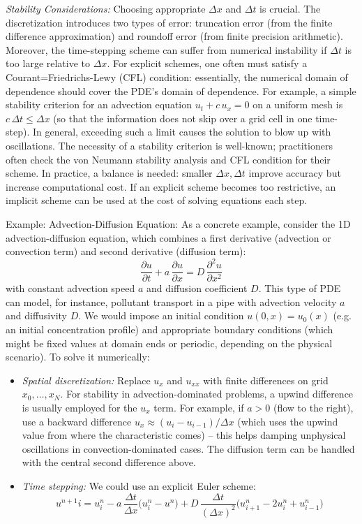 \documentclass{adonis}
\begin{document}
\textit{Stability Considerations:} Choosing appropriate $\Delta x$ and $\Delta t$ is crucial. The discretization introduces two types of error: truncation error (from the finite difference approximation) and roundoff error (from finite precision arithmetic). Moreover, the time-stepping scheme can suffer from numerical instability if $\Delta t$ is too large relative to $\Delta x$. For explicit schemes, one often must satisfy a Courant=Friedrichs-Lewy (CFL) condition: essentially, the numerical domain of dependence should cover the PDE's domain of dependence. For example, a simple stability criterion for an advection equation $u_t + c\,u_x=0$ on a uniform mesh is $c\,\Delta t \le \Delta x$ (so that the information does not skip over a grid cell in one time-step). In general, exceeding such a limit causes the solution to blow up with oscillations. The necessity of a stability criterion is well-known; practitioners often check the von Neumann stability analysis and CFL condition for their scheme. In practice, a balance is needed: smaller $\Delta x, \Delta t$ improve accuracy but increase computational cost. If an explicit scheme becomes too restrictive, an implicit scheme can be used at the cost of solving equations each step. 

Example: Advection-Diffusion Equation: As a concrete example, consider the 1D advection-diffusion equation, which combines a first derivative (advection or convection term) and second derivative (diffusion term):
$$ 
\frac{\partial u}{\partial t} + a\,\frac{\partial u}{\partial x} = D\,\frac{\partial^2 u}{\partial x^2}
$$
with constant advection speed $a$ and diffusion coefficient $D$. This type of PDE can model, for instance, pollutant transport in a pipe with advection velocity $a$ and diffusivity $D$. We would impose an initial condition $u(0,x)=u_0(x)$ (e.g. an initial concentration profile) and appropriate boundary conditions (which might be fixed values at domain ends or periodic, depending on the physical scenario). To solve it numerically: 

\begin{itemize}
    \item \textit{Spatial discretization:} Replace $u_x$ and $u_{xx}$ with finite differences on grid $x_0,\dots,x_N$. For stability in advection-dominated problems, a upwind difference is usually employed for the $u_x$ term. For example, if $a>0$ (flow to the right), use a backward difference $u_x \approx (u_i - u_{i-1})/\Delta x$ (which uses the upwind value from where the characteristic comes) – this helps damping unphysical oscillations in convection-dominated cases. The diffusion term can be handled with the central second difference above. 
    \item \textit{Time stepping:} We could use an explicit Euler scheme:
    $$
    u^{n+1}i = u^n_i - a\,\frac{\Delta t}{\Delta x}\Big(u^n_i - u^n\Big) + D\,\frac{\Delta t}{(\Delta x)^2}\Big(u^n_{i+1} - 2u^n_i + u^n_{i-1}\Big)
    $$
\end{itemize}
\end{document}
